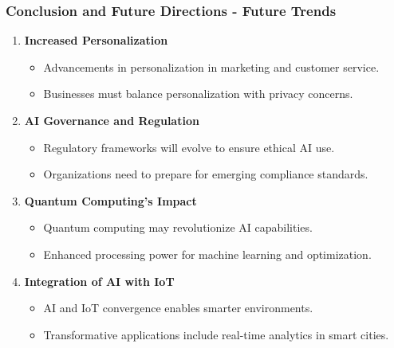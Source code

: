 \documentclass[aspectratio=169]{beamer}
\begin{document}
\begin{frame}[fragile]
    \frametitle{Conclusion and Future Directions - Future Trends}
    \begin{enumerate}
        \item \textbf{Increased Personalization}
            \begin{itemize}
                \item Advancements in personalization in marketing and customer service.
                \item Businesses must balance personalization with privacy concerns.
            \end{itemize}

        \item \textbf{AI Governance and Regulation}
            \begin{itemize}
                \item Regulatory frameworks will evolve to ensure ethical AI use.
                \item Organizations need to prepare for emerging compliance standards.
            \end{itemize}

        \item \textbf{Quantum Computing's Impact}
            \begin{itemize}
                \item Quantum computing may revolutionize AI capabilities.
                \item Enhanced processing power for machine learning and optimization.
            \end{itemize}

        \item \textbf{Integration of AI with IoT}
            \begin{itemize}
                \item AI and IoT convergence enables smarter environments.
                \item Transformative applications include real-time analytics in smart cities.
            \end{itemize}
    \end{enumerate}
\end{frame}
\end{document}
